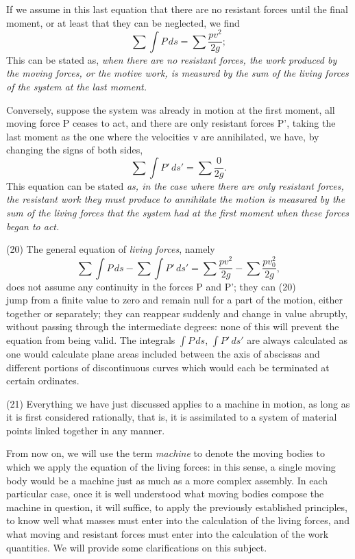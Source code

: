 \documentclass{book}
\begin{document}
If we assume in this last equation that there are no resistant forces until the final moment, or at least that they can be neglected, we find
\[\sum \int P \, ds = \sum \frac{pv^2}{2g} ;\]
This can be stated as, \textit{when there are no resistant forces, the work produced by the moving forces, or the motive work, is measured by the sum of the living forces of the system at the last moment.}

Conversely, suppose the system was already in motion at the first moment, all moving force P ceases to act, and there are only resistant forces P', taking the last moment as the one where the velocities v are annihilated, we have, by changing the signs of both sides,
\[\sum \int P' \, ds' = \sum \frac{0}{2g} .\]
This equation can be stated \textit{as, in the case where there are only resistant forces, the resistant work they must produce to annihilate the motion is measured by the sum of the \textit{living forces} that the system had at the first moment when these forces began to act.}

(20) The general equation of \textit{living forces}, namely
\[\sum \int P \, ds - \sum \int P' \, ds' = \sum \frac{pv^2}{2g} - \sum \frac{pv_0^2}{2g},\]
does not assume any continuity in the forces P and P'; they can 
\newpage
(20)\\
jump from a finite value to zero and remain null for a part of the motion, either together or separately; they can reappear suddenly and change in value abruptly, without passing through the intermediate degrees: none of this will prevent the equation from being valid. The integrals \(\int P \, ds\), \(\int P' \, ds'\) are always calculated as one would calculate plane areas included between the axis of abscissas and different portions of discontinuous curves which would each be terminated at certain ordinates.

(21) Everything we have just discussed applies to a machine in motion, as long as it is first considered rationally, that is, it is assimilated to a system of material points linked together in any manner.

From now on, we will use the term \textit{machine} to denote the moving bodies to which we apply the equation of the living forces: in this sense, a single moving body would be a machine just as much as a more complex assembly. In each particular case, once it is well understood what moving bodies compose the machine in question, it will suffice, to apply the previously established principles, to know well what masses must enter into the calculation of the living forces, and what moving and resistant forces must enter into the calculation of the work quantities. We will provide some clarifications on this subject.
\end{document}
